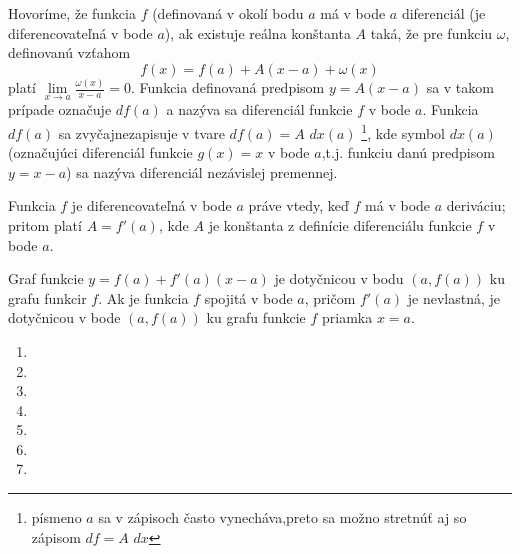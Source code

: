 Hovoríme, že funkcia $f$ (definovaná v okolí bodu $a$ má v bode $a$
diferenciál (je diferencovateľná v bode $a$), ak existuje reálna konštanta $A$
taká, že pre funkciu $\omega$, definovanú vzťahom
\[
  f(x)=f(a)+A(x-a)+\omega(x)
\]
platí $\lim\limits_{x \rightarrow a}\frac{\omega(x)}{x-a}=0$. Funkcia definovaná
predpisom $y=A(x-a)$ sa v takom prípade označuje $df(a)$ a nazýva sa diferenciál
funkcie $f$ v bode $a$. Funkcia $df(a)$ sa zvyčajnezapisuje v tvare $df(a)=A$
$dx(a)$ \footnote{písmeno $a$ sa v zápisoch často vynecháva,preto sa možno
stretnúť aj so zápisom $df=A$ $dx$}, kde symbol $dx(a)$ (označujúci diferenciál
funkcie $g(x)=x$ v bode $a$,t.j. funkciu danú predpisom $y=x-a$) sa nazýva
diferenciál nezávislej premennej.
\begin{veta}
Funkcia $f$ je diferencovateľná v bode $a$ práve vtedy, keď $f$ má v bode $a$
deriváciu; pritom platí $A=f'(a)$, kde $A$ je konštanta z definície diferenciálu
funkcie $f$ v bode $a$.
\end{veta}

Graf funkcie $y=f(a)+f'(a)(x-a)$ je dotyčnicou v bodu $(a,f(a))$ ku grafu
funkcir $f$. Ak je funkcia $f$ spojitá v bode $a$, pričom $f'(a)$ je nevlastná,
je dotyčnicou v bode $(a,f(a))$ ku grafu funkcie $f$ priamka $x=a$.

\begin{enumerate}[resume]
  \item {}
  \item {}
  \item {}
  \item {}
  \item {}
  \item {}
  \item {}
\end{enumerate}
